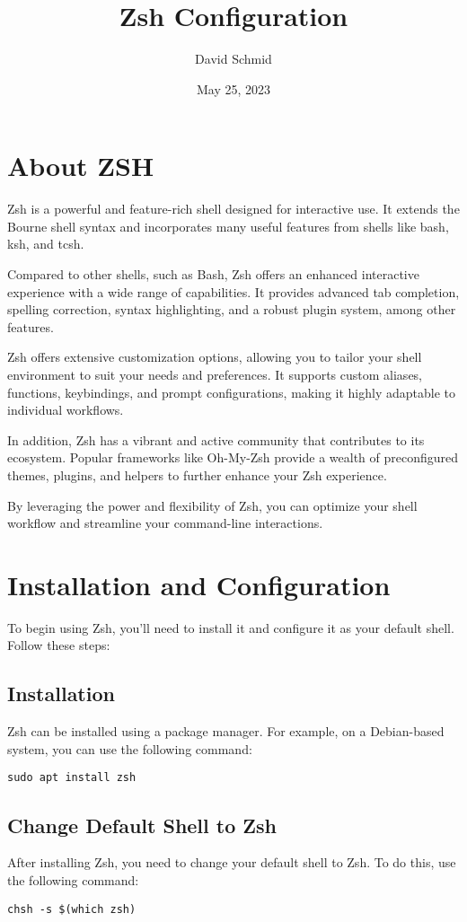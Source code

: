 \documentclass{article}
\title{Zsh Configuration}
\author{David Schmid}
\date{May 25, 2023}
\begin{document}
\maketitle

\section{About ZSH}
Zsh is a powerful and feature-rich shell designed for interactive use. It 
extends the Bourne shell syntax and incorporates many useful features from 
shells like bash, ksh, and tcsh.

Compared to other shells, such as Bash, Zsh offers an enhanced interactive 
experience with a wide range of capabilities. It provides advanced tab 
completion, spelling correction, syntax highlighting, and a robust plugin 
system, among other features.

Zsh offers extensive customization options, allowing you to tailor your shell 
environment to suit your needs and preferences. It supports custom aliases, 
functions, keybindings, and prompt configurations, making it highly adaptable 
to individual workflows.

In addition, Zsh has a vibrant and active community that contributes to its 
ecosystem. Popular frameworks like Oh-My-Zsh provide a wealth of preconfigured 
themes, plugins, and helpers to further enhance your Zsh experience.

By leveraging the power and flexibility of Zsh, you can optimize your shell 
workflow and streamline your command-line interactions.

\section{Installation and Configuration}
To begin using Zsh, you'll need to install it and configure it as your 
default shell. Follow these steps:

\subsection{Installation}
Zsh can be installed using a package manager. For example, on a Debian-based 
system, you can use the following command:
\begin{verbatim}
sudo apt install zsh
\end{verbatim}

\subsection{Change Default Shell to Zsh}
After installing Zsh, you need to change your default shell to Zsh. To do this, 
use the following command:
\begin{verbatim}
chsh -s $(which zsh)
\end{verbatim}
\end{document}
